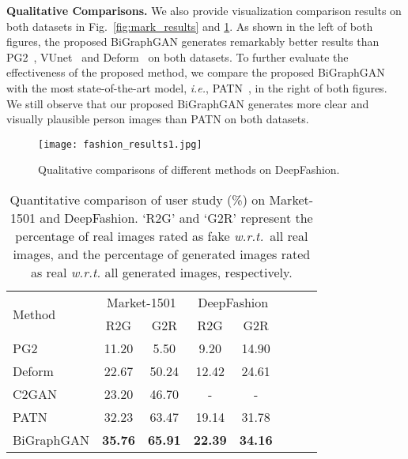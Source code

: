 \documentclass{bmvc2k}
\begin{document}
\noindent \textbf{Qualitative Comparisons.}
We also provide visualization comparison results on both datasets in Fig.~\ref{fig:mark_results} and \ref{fig:fashion_results}.
As shown in the left of both figures, the proposed BiGraphGAN generates remarkably better results than PG2~\cite{ma2017pose}, VUnet~\cite{esser2018variational} and Deform~\cite{siarohin2018deformable} on both datasets.
To further evaluate the effectiveness of the proposed method, we compare the proposed BiGraphGAN with the most state-of-the-art model, \emph{i.e.}, PATN~\cite{zhu2019progressive}, in the right of both figures.
We still observe that our proposed BiGraphGAN generates more clear and visually plausible person images than PATN on both datasets.

\begin{figure}[!t]
	\centering
	\texttt{[image: fashion\_results1.jpg]}
	\caption{Qualitative comparisons of different methods on DeepFashion.}
	\label{fig:fashion_results}
\end{figure}

\begin{table}[!t]
	\centering
	\caption{Quantitative comparison of user study (\%) on Market-1501 and DeepFashion. `R2G' and `G2R' represent the percentage of real images rated as fake \emph{w.r.t.}~all real images, and the percentage of generated images rated as real \emph{w.r.t.} all generated images, respectively.}
\begin{tabular}{lccccccc} \toprule
		\multirow{2}{*}{Method}  & \multicolumn{2}{c}{Market-1501} & \multicolumn{2}{c}{DeepFashion} \\ \cmidrule(lr){2-3} \cmidrule(lr){4-5} 
		& R2G & G2R & R2G & G2R    \\ \hline	
		PG2~\cite{ma2017pose}                              & 11.20  & 5.50    & 9.20   & 14.90 \\
		Deform~\cite{siarohin2018deformable}    & 22.67 & 50.24  & 12.42 & 24.61 \\ 
		C2GAN~\cite{tang2019cycle}                      & 23.20 & 46.70  & -     & -     \\
		PATN~\cite{zhu2019progressive}   & 32.23 & 63.47  & 19.14 & 31.78 \\  
		BiGraphGAN                                       & \textbf{35.76} & \textbf{65.91}  & \textbf{22.39} & \textbf{34.16}  \\	
		\bottomrule	
	\end{tabular}
	\label{tab:pose_ruser}
\end{table}
\end{document}
